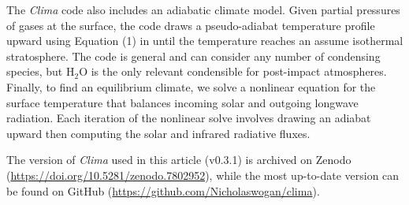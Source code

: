 The \emph{Clima} code also includes an adiabatic climate model. Given partial pressures of gases at the surface, the code draws a pseudo-adiabat temperature profile upward using Equation (1) in \citet{Graham_2021} until the temperature reaches an assume isothermal stratosphere. The code is general and can consider any number of condensing species, but H$_2$O is the only relevant condensible for post-impact atmospheres. Finally, to find an equilibrium climate, we solve a nonlinear equation for the surface temperature that balances incoming solar and outgoing longwave radiation. Each iteration of the nonlinear solve involves drawing an adiabat upward then computing the solar and infrared radiative fluxes.

The version of \emph{Clima} used in this article (v0.3.1) is archived on Zenodo (\url{https://doi.org/10.5281/zenodo.7802952}), while the most up-to-date version can be found on GitHub (\url{https://github.com/Nicholaswogan/clima}).

